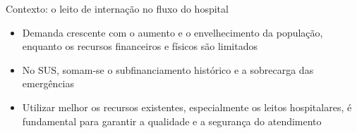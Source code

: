 \documentclass[aspectratio=169,10pt]{beamer}
\newcommand{\framerefs}{}
\newcommand{\slidecites}[1]{\gdef\framerefs{Referências: \cite{#1}}}
\gdef\framerefs{}%
\begin{document}
\begin{frame}{Contexto: o leito de internação no fluxo do hospital}
    \slidecites{brandeau2004operations, schafer2023combining, he2019systematic, paim2011brazilian, bittencourt2009intervencoes}
    \centering

    \vspace{0.35cm}
    \raggedright
    \begin{itemize}\setlength{\itemsep}{5pt}
        \item Demanda crescente com o aumento e o envelhecimento da população, enquanto os recursos financeiros e físicos são limitados
        \item No SUS, somam-se o subfinanciamento histórico e a sobrecarga das emergências
        \item Utilizar melhor os recursos existentes, especialmente os leitos hospitalares, é fundamental para garantir a qualidade e a segurança do atendimento
    \end{itemize}
\end{frame}
\end{document}
